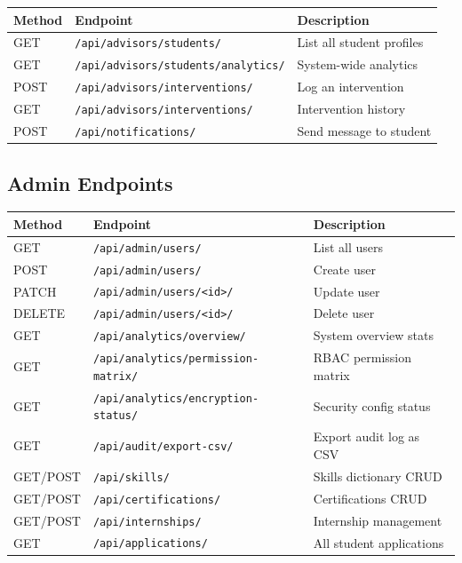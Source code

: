 \documentclass[12pt, a4paper]{article}
\begin{document}
{\small
\begin{longtable}{p{1.3cm}p{5.5cm}p{6.5cm}}
\toprule
\textbf{Method} & \textbf{Endpoint} & \textbf{Description} \\
\midrule
\endhead
GET & \texttt{/api/advisors/students/} & List all student profiles \\
GET & \texttt{/api/advisors/students/analytics/} & System-wide analytics \\
POST & \texttt{/api/advisors/interventions/} & Log an intervention \\
GET & \texttt{/api/advisors/interventions/} & Intervention history \\
POST & \texttt{/api/notifications/} & Send message to student \\
\bottomrule
\end{longtable}
}

\subsection{Admin Endpoints}

{\small
\begin{longtable}{p{1.3cm}p{5.5cm}p{6.5cm}}
\toprule
\textbf{Method} & \textbf{Endpoint} & \textbf{Description} \\
\midrule
\endhead
GET & \texttt{/api/admin/users/} & List all users \\
POST & \texttt{/api/admin/users/} & Create user \\
PATCH & \texttt{/api/admin/users/\textless id\textgreater/} & Update user \\
DELETE & \texttt{/api/admin/users/\textless id\textgreater/} & Delete user \\
GET & \texttt{/api/analytics/overview/} & System overview stats \\
GET & \texttt{/api/analytics/permission-matrix/} & RBAC permission matrix \\
GET & \texttt{/api/analytics/encryption-status/} & Security config status \\
GET & \texttt{/api/audit/export-csv/} & Export audit log as CSV \\
GET/POST & \texttt{/api/skills/} & Skills dictionary CRUD \\
GET/POST & \texttt{/api/certifications/} & Certifications CRUD \\
GET/POST & \texttt{/api/internships/} & Internship management \\
GET & \texttt{/api/applications/} & All student applications \\
\bottomrule
\end{longtable}
}
\end{document}
